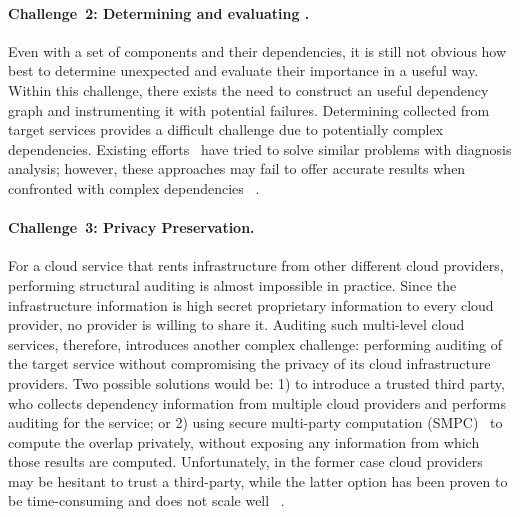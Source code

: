 \paragraph{Challenge~2: Determining and evaluating \rgs.}
Even with a set of components and their dependencies,
it is still not obvious how best to determine unexpected \rgs and 
evaluate their importance in a useful way.
Within this challenge, there exists the need to construct an useful
dependency graph and instrumenting it with potential failures.
Determining \rgs collected from target services provides 
a difficult challenge due to potentially complex dependencies.
Existing efforts~\cite{bahl07highly, kompella05ip} 
have tried to solve similar problems with
diagnosis analysis; however, these approaches may fail to 
offer accurate results when confronted with complex dependencies%
~\cite{wu12netpilot}.


\paragraph{Challenge~3: Privacy Preservation.}
For a cloud service that rents infrastructure
from other different cloud providers,
performing structural auditing is almost impossible in practice.
Since the infrastructure information 
is high secret proprietary information
to every cloud provider, no provider is willing to share it.
Auditing such multi-level cloud services, therefore,
introduces another complex challenge:
performing auditing of the target service
without compromising the privacy of its 
cloud infrastructure providers.
Two possible solutions would be:
1) to introduce a trusted third party,
who collects dependency information from
multiple cloud providers 
and performs auditing for the service;
or 2) using secure multi-party 
computation (SMPC)~\cite{yao82protocols}
to compute the overlap privately,
without exposing any information from which those results are computed.
Unfortunately, in the former case cloud
providers may be hesitant to trust a third-party,
while the latter option has been proven 
to be time-consuming and does not scale well%
~\cite{zhai13auditing, xiao13structural}.

